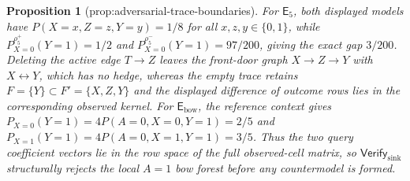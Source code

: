 \documentclass{article}
\newtheorem{proposition}{Proposition}
\begin{document}
\begin{proposition}[prop:adversarial-trace-boundaries]\label{prop:adversarial-trace-boundaries}
For \(\mathsf E_5\), both displayed models have \(P(X=x,Z=z,Y=y)=1/8\) for all \(x,z,y\in\{0,1\}\), while \(P_{X=0}^{\rho^+_5}(Y=1)=1/2\) and \(P_{X=0}^{\rho^-_5}(Y=1)=97/200\), giving the exact gap \(3/200\). Deleting the active edge \(T\to Z\) leaves the front-door graph \(X\to Z\to Y\) with \(X\leftrightarrow Y\), which has no hedge, whereas the empty trace retains \(F=\{Y\}\subset F'=\{X,Z,Y\}\) and the displayed difference of outcome rows lies in the corresponding observed kernel. For \(\mathsf E_{\mathrm{bow}}\), the reference context gives \(P_{X=0}(Y=1)=4P(A=0,X=0,Y=1)=2/5\) and \(P_{X=1}(Y=1)=4P(A=0,X=1,Y=1)=3/5\). Thus the two query coefficient vectors lie in the row space of the full observed-cell matrix, so \(\mathsf{Verify}_{\mathrm{sink}}\) structurally rejects the local \(A=1\) bow forest before any countermodel is formed.
\end{proposition}
\end{document}
